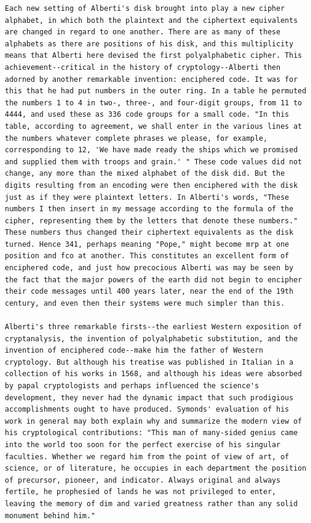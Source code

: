 \documentclass[12pt,a4paper]{article}
\begin{document}
\begin{lstlisting}[caption={Recovered plaintext with restored word spacing}, label={lst:final_plaintext}]
Each new setting of Alberti's disk brought into play a new cipher alphabet, in which both the plaintext and the ciphertext equivalents are changed in regard to one another. There are as many of these alphabets as there are positions of his disk, and this multiplicity means that Alberti here devised the first polyalphabetic cipher. This achievement--critical in the history of cryptology--Alberti then adorned by another remarkable invention: enciphered code. It was for this that he had put numbers in the outer ring. In a table he permuted the numbers 1 to 4 in two-, three-, and four-digit groups, from 11 to 4444, and used these as 336 code groups for a small code. "In this table, according to agreement, we shall enter in the various lines at the numbers whatever complete phrases we please, for example, corresponding to 12, 'We have made ready the ships which we promised and supplied them with troops and grain.' " These code values did not change, any more than the mixed alphabet of the disk did. But the digits resulting from an encoding were then enciphered with the disk just as if they were plaintext letters. In Alberti's words, "These numbers I then insert in my message according to the formula of the cipher, representing them by the letters that denote these numbers." These numbers thus changed their ciphertext equivalents as the disk turned. Hence 341, perhaps meaning "Pope," might become mrp at one position and fco at another. This constitutes an excellent form of enciphered code, and just how precocious Alberti was may be seen by the fact that the major powers of the earth did not begin to encipher their code messages until 400 years later, near the end of the 19th century, and even then their systems were much simpler than this.

Alberti's three remarkable firsts--the earliest Western exposition of cryptanalysis, the invention of polyalphabetic substitution, and the invention of enciphered code--make him the father of Western cryptology. But although his treatise was published in Italian in a collection of his works in 1568, and although his ideas were absorbed by papal cryptologists and perhaps influenced the science's development, they never had the dynamic impact that such prodigious accomplishments ought to have produced. Symonds' evaluation of his work in general may both explain why and summarize the modern view of his cryptological contributions: "This man of many-sided genius came into the world too soon for the perfect exercise of his singular faculties. Whether we regard him from the point of view of art, of science, or of literature, he occupies in each department the position of precursor, pioneer, and indicator. Always original and always fertile, he prophesied of lands he was not privileged to enter, leaving the memory of dim and varied greatness rather than any solid monument behind him."


\end{lstlisting}
\end{document}
